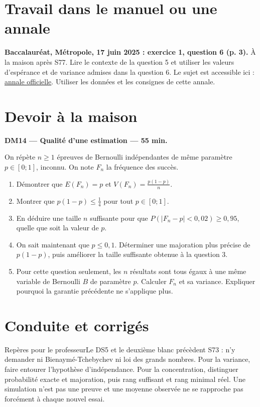 \section{Travail dans le manuel ou une annale}\textbf{Baccalauréat, Métropole, 17 juin 2025 : exercice 1, question 6 (p. 3).} À la maison après S77. Lire le contexte de la question 5 et utiliser les valeurs d'espérance et de variance admises dans la question 6. Le sujet est accessible ici : \href{https://www.education.gouv.fr/sites/default/files/2025-06/baccalaur-at-g-n-ral-2025-math-matiques-440856.pdf}{annale officielle}. Utiliser les données et les consignes de cette annale.

\section{Devoir à la maison}\textbf{DM14 --- Qualité d'une estimation --- 55 min.}\par On répète $n\ge1$ épreuves de Bernoulli indépendantes de même paramètre $p\in[0;1]$, inconnu. On note $F_n$ la fréquence des succès.
\begin{enumerate}\item Démontrer que $E(F_n)=p$ et $V(F_n)=\frac{p(1-p)}n$.
\item Montrer que $p(1-p)\le\frac14$ pour tout $p\in[0;1]$.
\item En déduire une taille $n$ suffisante pour que $P(|F_n-p|<0{,}02)\ge0{,}95$, quelle que soit la valeur de $p$.
\item On sait maintenant que $p\le0{,}1$. Déterminer une majoration plus précise de $p(1-p)$, puis améliorer la taille suffisante obtenue à la question 3.
\item Pour cette question seulement, les $n$ résultats sont tous égaux à une même variable de Bernoulli $B$ de paramètre $p$. Calculer $F_n$ et sa variance. Expliquer pourquoi la garantie précédente ne s'applique plus.\end{enumerate}

\ifprof\clearpage\section{Conduite et corrigés}\begin{profbox}{Repères pour le professeur}Le DS5 et le deuxième blanc précèdent S73 : n'y demander ni Bienaymé-Tchebychev ni loi des grands nombres. Pour la variance, faire entourer l'hypothèse d'indépendance. Pour la concentration, distinguer probabilité exacte et majoration, puis rang suffisant et rang minimal réel. Une simulation n'est pas une preuve et une moyenne observée ne se rapproche pas forcément à chaque nouvel essai.\end{profbox}

